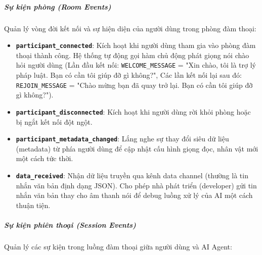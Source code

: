 \subparagraph{Sự kiện phòng (Room Events)}

Quản lý vòng đời kết nối và sự hiện diện của người dùng trong phòng đàm thoại:

\begin{itemize}
\item \textbf{\texttt{participant\_connected}}: Kích hoạt khi người dùng tham gia vào phòng đàm thoại thành công. Hệ thống tự động gọi hàm chủ động phát giọng nói chào hỏi người dùng (Lần đầu kết nối: \texttt{WELCOME\_MESSAGE} = "Xin chào, tôi là trợ lý pháp luật. Bạn có cần tôi giúp đỡ gì không?", Các lần kết nối lại sau đó: \texttt{REJOIN\_MESSAGE} = "Chào mừng bạn đã quay trở lại. Bạn có cần tôi giúp đỡ gì không?").

\item \textbf{\texttt{participant\_disconnected}}: Kích hoạt khi người dùng rời khỏi phòng hoặc bị ngắt kết nối đột ngột.

\item \textbf{\texttt{participant\_metadata\_changed}}: Lắng nghe sự thay đổi siêu dữ liệu (metadata) từ phía người dùng để cập nhật cấu hình giọng đọc, nhân vật mới một cách tức thời.

\item \textbf{\texttt{data\_received}}: Nhận dữ liệu truyền qua kênh data channel (thường là tin nhắn văn bản định dạng JSON). Cho phép nhà phát triển (developer) gửi tin nhắn văn bản thay cho âm thanh nói để debug luồng xử lý của AI một cách thuận tiện.
\end{itemize}

\subparagraph{Sự kiện phiên thoại (Session Events)}

Quản lý các sự kiện trong luồng đàm thoại giữa người dùng và AI Agent:

